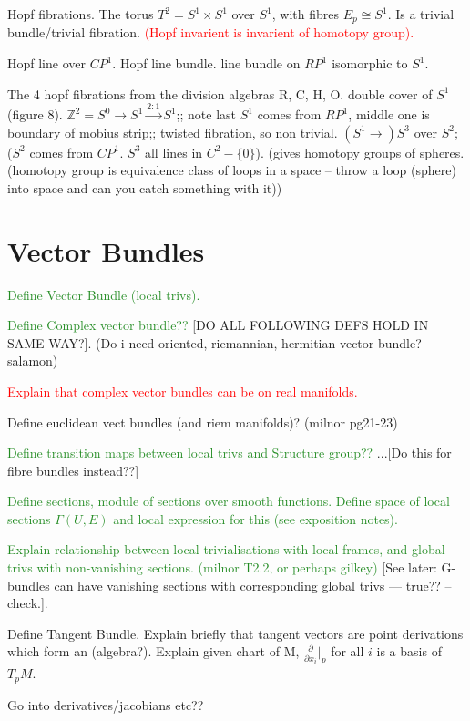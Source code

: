 \documentclass[a4paper]{article}
\theoremstyle{definition} \newtheorem*{definition}{Definition}
\theoremstyle{definition} \newtheorem*{definitions}{Definitions}
\theoremstyle{plain} \newtheorem{theorem}{Theorem}[section]
\theoremstyle{plain} \newtheorem{proposition}[theorem]{Proposition}
\theoremstyle{plain} \newtheorem{corollary}[theorem]{Corollary}
\theoremstyle{plain} \newtheorem{lemma}[theorem]{Lemma}
\theoremstyle{plain} \newtheorem{example}[theorem]{Example}
\newcommand{\done}[1]{\textcolor{ForestGreen}{#1}}
\newcommand{\checkCorrect}[1]{\textcolor{red}{#1}}
\newcommand{\understandBetter}[1]{\textcolor{red}{#1}}
\begin{document}
Hopf fibrations. 
The torus $T^2 = S^1 \times S^1$ over $S^1$, with fibres $E_p \cong S^1$. Is a trivial bundle/trivial fibration. \understandBetter{(Hopf invarient is invarient of homotopy group).}

Hopf line over $CP^1$. 
Hopf line bundle. 
line bundle on $RP^1$ isomorphic to $S^1$. 

The 4 hopf fibrations from the division algebras R, C, H, O.
double cover of $S^1$ (figure 8). 
$\mathbb{Z}^2 = S^0 \to S^1 \xrightarrow{2:1} S^1$;; note last $S^1$ comes from $RP^1$, middle one is boundary of mobius strip;; twisted fibration, so non trivial.
$(S^1\to) S^3$ over $S^2$; ($S^2$ comes from $CP^1$. $S^3$ all lines in $C^2 - \{0\}$).
(gives homotopy groups of spheres. (homotopy group is equivalence class of loops in a space -- throw a loop (sphere) into space and can you catch something with it))

\section{Vector Bundles}

\done{Define Vector Bundle (local trivs).}

\done{Define Complex vector bundle??} [DO ALL FOLLOWING DEFS HOLD IN SAME WAY?]. (Do i need oriented, riemannian, hermitian vector bundle? -- salamon)

\checkCorrect{Explain that complex vector bundles can be on real manifolds.}

Define euclidean vect bundles (and riem manifolds)? (milnor pg21-23)

\done{Define transition maps between local trivs and Structure group??} ...[Do this for fibre bundles instead??]

\done{Define sections, module of sections over smooth functions. Define space of local sections $\Gamma (U, E)$ and local expression for this (see exposition notes).}

\done{Explain relationship between local trivialisations with local frames, and global trivs with non-vanishing sections. (milnor T2.2, or perhaps gilkey)}
[See later: G-bundles can have vanishing sections with corresponding global trivs --- true?? --check.]. 

Define Tangent Bundle. 
Explain briefly that tangent vectors are point derivations which form an (algebra?).
Explain given chart of M, $\frac{\partial}{\partial{x_i}} |_p$ for all $i$ is a basis of $T_p M$.

Go into derivatives/jacobians etc??
\end{document}
